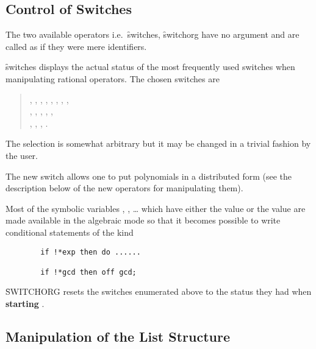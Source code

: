 \subsection{Control of Switches}
\hypertarget{operator:SWITCHES}{}
\hypertarget{operator:SWITCHORG}{}
The two available operators i.e.\ \f{switches}, \f{switchorg} have
no argument and are called as if they were mere identifiers.

\f{switches} displays the actual status of the most frequently used switches
when manipulating rational operators. The chosen switches are
\begin{quote}
  , , , , , , , , \\
  , , , , , \\
  , , , .
\end{quote}

The selection is somewhat arbitrary but it may be changed in a trivial
fashion by the user.

\hypertarget{switch:DISTRIBUTE}{}
The new switch  allows one to put polynomials in a
distributed form (see the description below of
the new operators for manipulating them).

Most of the symbolic variables , , \ldots{}
which have either the value  or the value  are made available in the
algebraic mode so that it becomes possible to write conditional
statements of the kind
\begin{verbatim}
        if !*exp then do ......

        if !*gcd then off gcd;
\end{verbatim}
\f{SWITCHORG} resets  the switches enumerated above to the status
they had when \textbf{starting} \REDUCE.

\subsection{Manipulation of the List Structure}

